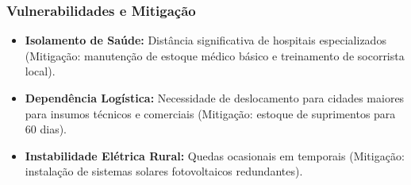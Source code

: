 \subsubsection{Vulnerabilidades e
Mitigação}

\begin{itemize}
\tightlist
\item
  \textbf{Isolamento de Saúde:} Distância significativa de hospitais
  especializados (Mitigação: manutenção de estoque médico básico e
  treinamento de socorrista local).
\item
  \textbf{Dependência Logística:} Necessidade de deslocamento para
  cidades maiores para insumos técnicos e comerciais (Mitigação: estoque
  de suprimentos para 60 dias).
\item
  \textbf{Instabilidade Elétrica Rural:} Quedas ocasionais em temporais
  (Mitigação: instalação de sistemas solares fotovoltaicos redundantes).
\end{itemize}

